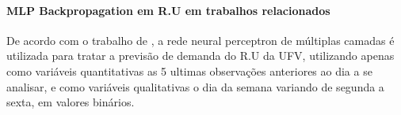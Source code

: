   	       \begin{figure}[H]
  	       \end{figure}
  	       
  	       \paragraph*{MLP Backpropagation em R.U em trabalhos relacionados}
  	       De acordo com o trabalho de \cite{Lopes2008}, a rede neural perceptron de múltiplas camadas é utilizada para tratar a previsão de demanda do R.U da UFV, utilizando apenas como variáveis quantitativas as 5 ultimas observações anteriores ao dia a se analisar, e como variáveis qualitativas o dia da semana variando de segunda a sexta, em valores binários.
  	       
           \begin{figure}[H]
           \end{figure}
            
